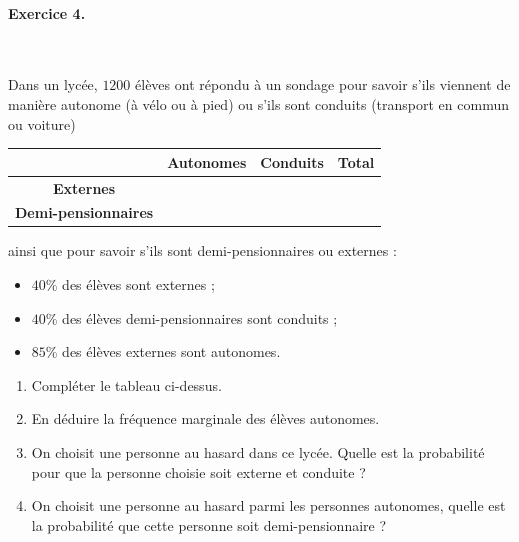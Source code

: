 \documentclass[11pt]{article}
\begin{document}
\paragraph{Exercice 4.}~\\
\begin{minipage}{.35\textwidth}
  Dans un lycée, $1200$ élèves ont répondu à un sondage pour savoir s'ils
  viennent de manière autonome (à vélo ou à pied) ou s'ils sont conduits
  (transport en commun ou voiture)
\end{minipage}
\begin{minipage}{.65\textwidth}
\begin{center}
\renewcommand{\arraystretch}{2}
\begin{tabular}{|c|c|c|c|}
  \cline{2-4}
  \multicolumn{1}{c|}{} & \textbf{Autonomes} & \textbf{Conduits} &
  \textbf{Total} \\
  \hline
  \textbf{Externes} & & & \\
  \hline
  \textbf{Demi-pensionnaires} & & & \\
  \hline
\end{tabular}
\end{center}
\end{minipage}
ainsi que pour savoir s'ils sont demi-pensionnaires ou externes :
\begin{itemize}
  \item $40$\% des élèves sont externes ;
  \item $40$\% des élèves demi-pensionnaires sont conduits ;
  \item $85$\% des élèves externes sont autonomes.
\end{itemize}
\begin{enumerate}
  \item Compléter le tableau ci-dessus.
  \item En déduire la fréquence marginale des élèves autonomes.
  \item On choisit une personne au hasard dans ce lycée. Quelle est la
    probabilité pour que la personne choisie soit externe et conduite ?
  \item On choisit une personne au hasard parmi les personnes autonomes, quelle
    est la probabilité que cette personne soit demi-pensionnaire ?
\end{enumerate}
\end{document}
